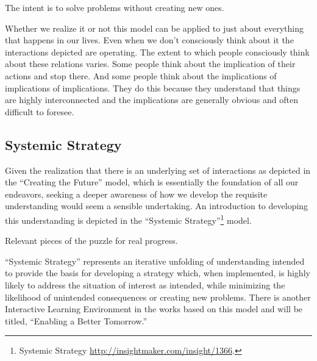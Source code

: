 \documentclass[]{memoir}
\begin{document}
\FloatBarrier 

\begin{model}[frametitle={Model: Creating the Future}] 

 The intent is to solve problems without creating new ones.




 \end{model}

Whether we realize it or not this model can be applied to just about
everything that happens in our lives. Even when we don't consciously
think about it the interactions depicted are operating. The extent to
which people consciously think about these relations varies. Some people
think about the implication of their actions and stop there. And some
people think about the implications of implications of implications.
They do this because they understand that things are highly
interconnected and the implications are generally obvious and often
difficult to foresee.

\subsection{Systemic Strategy}

Given the realization that there is an underlying set of interactions as
depicted in the ``Creating the Future'' model, which is essentially the
foundation of all our endeavors, seeking a deeper awareness of how we
develop the requisite understanding would seem a sensible undertaking.
An introduction to developing this understanding is depicted in the
``Systemic Strategy''\footnote{Systemic Strategy
  \url{http://insightmaker.com/insight/1366}.} model.

\FloatBarrier 

\begin{model}[frametitle={Model: Systemic Strategy}] 

 Relevant pieces of the puzzle for real progress.




 \end{model}

``Systemic Strategy'' represents an iterative unfolding of understanding
intended to provide the basis for developing a strategy which, when
implemented, is highly likely to address the situation of interest as
intended, while minimizing the likelihood of unintended consequences or
creating new problems. There is another Interactive Learning Environment
in the works based on this model and will be titled, ``Enabling a Better
Tomorrow.''
\end{document}
